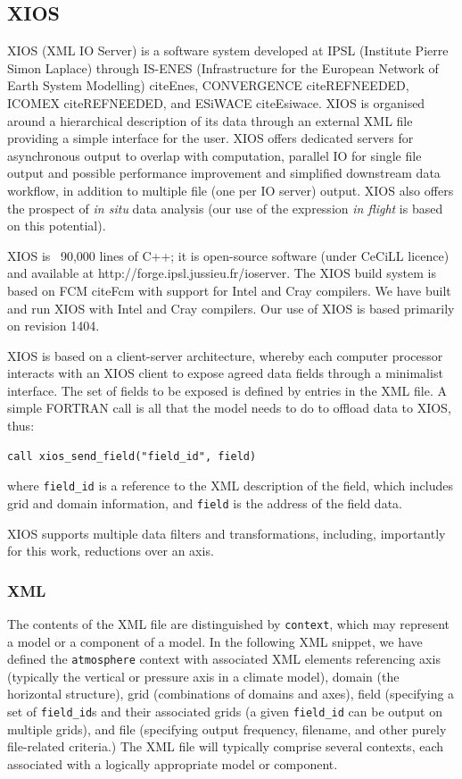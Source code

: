 \documentclass[twocolumn, 12pt]{paper}
\begin{document}
\subsection{XIOS}

XIOS (XML IO Server) is a software system developed at IPSL (Institute Pierre Simon Laplace) through IS-ENES (Infrastructure for the European Network of Earth System Modelling) cite{Enes}, CONVERGENCE cite{REFNEEDED}, ICOMEX cite{REFNEEDED}, and ESiWACE cite{Esiwace}.
XIOS is organised around a hierarchical description of its data through an external XML file providing a simple interface for the user.
XIOS offers dedicated servers for asynchronous output to overlap with computation, parallel IO for single file output and possible performance improvement and simplified downstream data workflow, in addition to multiple file (one per IO server) output.
XIOS also offers the prospect of \textit{in situ} data analysis (our use of the expression \textit{in flight} is based on this potential).

XIOS is ~90,000 lines of C++; it is open-source software (under CeCiLL licence) and available at http://forge.ipsl.jussieu.fr/ioserver.
The XIOS build system is based on FCM cite{Fcm} with support for Intel and Cray compilers.
We have built and run XIOS with Intel and Cray compilers.
Our use of XIOS is based primarily on revision 1404.

XIOS is based on a client-server architecture, whereby each computer processor interacts with an XIOS client to expose agreed data fields through a minimalist interface.
The set of fields to be exposed is defined by entries in the XML file.
A simple FORTRAN call is all that the model needs to do to offload data to XIOS, thus:

\begin{verbatim}
call xios_send_field("field_id", field)
\end{verbatim}
where \texttt{field\_id} is a reference to the XML description of the field, which includes grid and domain information, and \texttt{field} is the address of the field data.

XIOS supports multiple data filters and transformations, including, importantly for this work, reductions over an axis.


\subsubsection{XML}

The contents of the XML file are distinguished by \texttt{context}, which may represent a model or a component of a model.
In the following XML snippet, we have defined the \texttt{atmosphere} context with associated XML elements referencing axis (typically the vertical or pressure axis in a climate model), domain (the horizontal structure), grid (combinations of domains and axes), field (specifying a set of \texttt{field\_id}s and their associated grids (a given \texttt{field\_id} can be output on multiple grids), and file (specifying  output frequency, filename, and other purely file-related criteria.) The XML file will typically comprise several contexts, each associated with a logically appropriate model or component.
\end{document}
